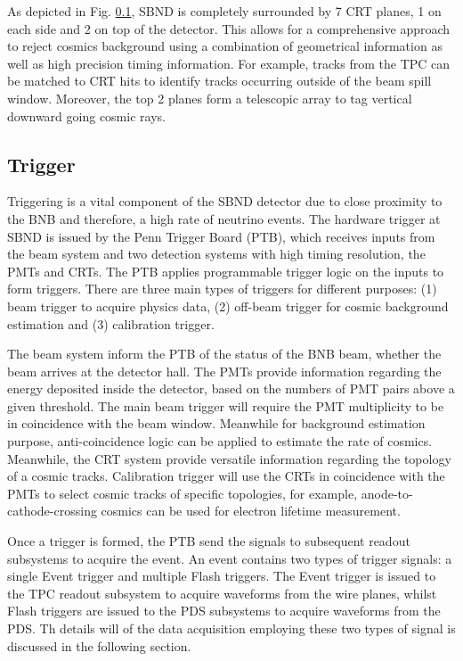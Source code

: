As depicted in Fig. \ref{}, SBND is completely surrounded by 7 CRT planes, 1 on each side and 2 on top of the detector. 
This allows for a comprehensive approach to reject cosmics background using a combination of geometrical information as well as high precision timing information. 
For example, tracks from the TPC can be matched to CRT hits to identify tracks occurring outside of the beam spill window.
Moreover, the top 2 planes form a telescopic array to tag vertical downward going cosmic rays.
 

\subsection{Trigger}


Triggering is a vital component of the SBND detector due to close proximity to the BNB and therefore, a high rate of neutrino events.
The hardware trigger at SBND is issued by the Penn Trigger Board (PTB), which receives inputs from the beam system and two detection systems with high timing resolution, the PMTs and CRTs.
The PTB applies programmable trigger logic on the inputs to form triggers.
There are three main types of triggers for different purposes: (1) beam trigger to acquire physics data, (2) off-beam trigger for cosmic background estimation and (3) calibration trigger.

The beam system inform the PTB of the status of the BNB beam, whether the beam arrives at the detector hall.
The PMTs provide information regarding the energy deposited inside the detector, based on the numbers of PMT pairs above a given threshold. 
The main beam trigger will require the PMT multiplicity to be in coincidence with the beam window.
Meanwhile for background estimation purpose, anti-coincidence logic can be applied to estimate the rate of cosmics.
Meanwhile, the CRT system provide versatile information regarding the topology of a cosmic tracks.
Calibration trigger will use the CRTs in coincidence with the PMTs to select cosmic tracks of specific topologies, for example, anode-to-cathode-crossing cosmics can be used for electron lifetime measurement.

Once a trigger is formed, the PTB send the signals to subsequent readout subsystems to acquire the event.
An event contains two types of trigger signals: a single Event trigger and multiple Flash triggers.
The Event trigger is issued to the TPC readout subsystem to acquire waveforms from the wire planes, whilst Flash triggers are issued to the PDS subsystems to acquire waveforms from the PDS.
Th details will of the data acquisition employing these two types of signal is discussed in the following section.


